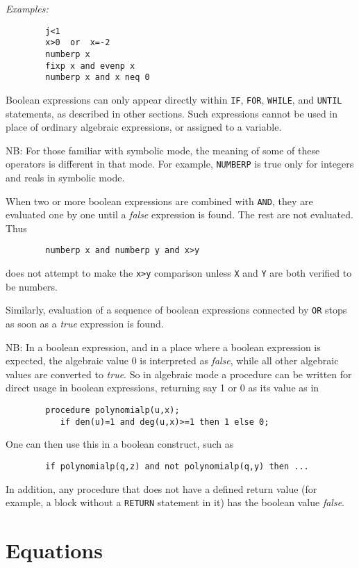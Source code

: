 {\it Examples:}
\begin{verbatim}
        j<1
        x>0  or  x=-2
        numberp x
        fixp x and evenp x
        numberp x and x neq 0
\end{verbatim}
Boolean expressions can only appear directly within {\tt IF}, {\tt FOR},
{\tt WHILE}, and {\tt UNTIL} statements, as described in other sections.
Such expressions cannot be used in place of ordinary algebraic expressions,
or assigned to a variable.

NB:  For those familiar with symbolic mode, the meaning of some of
these operators is different in that mode.  For example, {\tt NUMBERP} is
true only for integers and reals in symbolic mode.

When two or more boolean expressions are combined with {\tt AND}, they are
evaluated one by one until a {\em false\/} expression is found. The rest are
not evaluated. Thus
\begin{verbatim}
        numberp x and numberp y and x>y
\end{verbatim}
does not attempt to make the {\tt x>y} comparison unless {\tt X} and {\tt Y}
are both verified to be numbers.

Similarly, evaluation of a sequence of boolean expressions connected by
{\tt OR} stops as soon as a {\em true\/} expression is found.

NB:  In a boolean expression, and in a place where a boolean expression is
expected, the algebraic value 0 is interpreted as {\em false}, while all
other algebraic values are converted to {\em true}.  So in algebraic mode
a procedure can be written for direct usage in boolean expressions,
returning say 1 or 0 as its value as in

\begin{verbatim}
        procedure polynomialp(u,x);
           if den(u)=1 and deg(u,x)>=1 then 1 else 0;
\end{verbatim}

One can then use this in a boolean construct, such as
\begin{verbatim}
        if polynomialp(q,z) and not polynomialp(q,y) then ...
\end{verbatim}

In addition, any procedure that does not have a defined return value
(for example, a block without a {\tt RETURN} statement in it)
has the boolean value {\em false}. 

\section{Equations}

